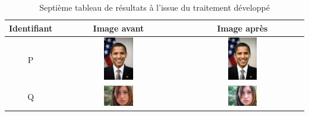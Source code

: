 \documentclass[11pt, french]{report-rd-info}
\begin{document}
\begin{table}
\centering
\begin{tabular}{|c|c|c|}	
   \hline \textbf{Identifiant}  &  \textbf{Image avant}  &  \textbf{Image après} \\ \hline 
   P & \includegraphics[width=0.25\textwidth]{Resultats/pp_avant} & \includegraphics[width=0.25\textwidth]{Resultats/pp_apres} \\ \hline      
   Q & \includegraphics[width=0.25\textwidth]{Resultats/pq_avant} & \includegraphics[width=0.25\textwidth]{Resultats/pq_apres} \\ \hline
\end{tabular}
\caption{Septième tableau de résultats à l'issue du traitement développé}
\label{tab:Resultats7}
\end{table}
\end{document}
